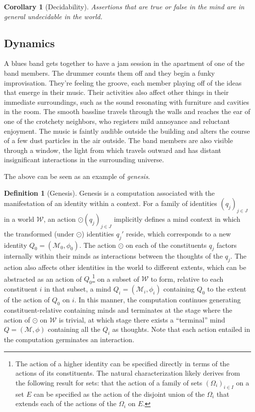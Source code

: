 \documentclass[pra,twocolumn,groupedaddress,10pt]{revtex4}
\newtheorem{corollary}[theorem]{Corollary}
\theoremstyle{definition}
\newtheorem{defn}{Definition}[section]
\begin{document}
\begin{corollary}[Decidability] \label{cor:decidability}
	Assertions that are true or false in the mind are in general undecidable in the world.
\end{corollary}

\subsection{Dynamics} \label{sec:dynamics}

A blues band gets together to have a jam session in the apartment of one of the band members. The drummer counts them off and they begin a funky improvisation. They're feeling the groove, each member playing off of the ideas that emerge in their music. Their activities also affect other things in their immediate surroundings, such as the sound resonating with furniture and cavities in the room. The smooth bassline travels through the walls and reaches the ear of one of the crotchety neighbors, who registers mild annoyance and reluctant enjoyment. The music is faintly audible outside the building and alters the course of a few dust particles in the air outside. The band members are also visible through a window, the light from which travels outward and has distant insignificant interactions in the surrounding universe.

The above can be seen as an example of \emph{genesis}.

\begin{defn}[Genesis]
	Genesis is a computation associated with the manifestation of an identity within a context. For a family of identities $(q_{j})_{j \in J}$ in a world $\mathcal{W}$, an action $\odot (q_{j})_{j \in J}$ implicitly defines a mind context in which the transformed (under $\odot$) identities $q_{j}'$ reside, which corresponds to a new identity $Q_{0} = (\mathcal{M}_{0}, \phi_{0})$. The action $\odot$ on each of the constituents $q_{j}$ factors internally within their minds as interactions between the thoughts of the $q_{j}$. The action also affects other identities in the world to different extents, which can be abstracted as an action of $Q_{0}$\footnote{The action of a higher identity can be specified directly in terms of the actions of its constituents. The natural characterization likely derives from the following result for sets: that the action of a family of sets $(\Omega_i)_{i \in I}$ on a set $E$ can be specified as the action of the disjoint union of the $\Omega_i$ that extends each of the actions of the $\Omega_i$ on $E$\cite{bourbaki}.} on a subset of $\mathcal{W}$ to form, relative to each constituent $i$ in that subset, a mind $Q_{i} = (\mathcal{M}_{i}, \phi_{i})$ containing $Q_{0}$ to the extent of the action of $Q_{0}$ on $i$. In this manner, the computation continues generating constituent-relative containing minds and terminates at the stage where the action of $\odot$ on $\mathcal{W}$ is trivial, at which stage there exists a ``terminal'' mind $Q = (\mathcal{M}, \phi)$ containing all the $Q_{i}$ as thoughts. Note that each action entailed in the computation germinates an interaction.
\end{defn}
\end{document}
